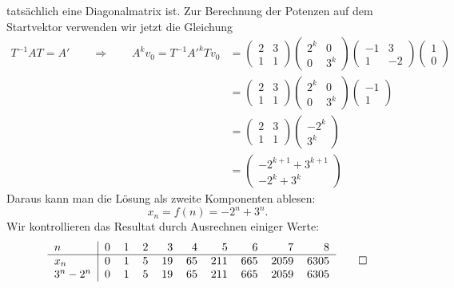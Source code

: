 \begin{loesung}
\[\]
tatsächlich eine Diagonalmatrix ist.
Zur Berechnung der Potenzen auf dem Startvektor verwenden wir jetzt die 
Gleichung
\begin{align*}
T^{-1}AT
=
A'
\qquad\Rightarrow\qquad
A^kv_0
=
T^{-1}A'^kTv_0
&=
\begin{pmatrix}
2&3\\
1&1
\end{pmatrix}
\begin{pmatrix}
2^k& 0\\
 0 &3^k
\end{pmatrix}
\begin{pmatrix}
-1& 3\\
 1&-2
\end{pmatrix}
\begin{pmatrix}
1\\0
\end{pmatrix}
\\
&=
\begin{pmatrix}
2&3\\
1&1
\end{pmatrix}
\begin{pmatrix}
2^k& 0\\
 0 &3^k
\end{pmatrix}
\begin{pmatrix}
-1\\1
\end{pmatrix}
\\
&=
\begin{pmatrix}
2&3\\
1&1
\end{pmatrix}
\begin{pmatrix}
-2^k\\
 3^k
\end{pmatrix}
\\
&=
\begin{pmatrix}
-2^{k+1}+3^{k+1}\\
-2^k+3^k
\end{pmatrix}
\end{align*}
Daraus kann man die Lösung als zweite Komponenten ablesen:
\[
x_n=f(n)=-2^n+3^n.
\]
Wir kontrollieren das Resultat durch Ausrechnen einiger Werte:
\[
\begin{tabular}{l|rrrrrrrrr}
$n$&0&1&2&3&4&5&6&7&8\\
\hline
$x_n$&0&1&5&19&65&211&665&2059&6305\\
$3^n-2^n$&0&1&5&19&65&211&665&2059&6305\\
\end{tabular}
\qedhere
\]
\end{loesung}

